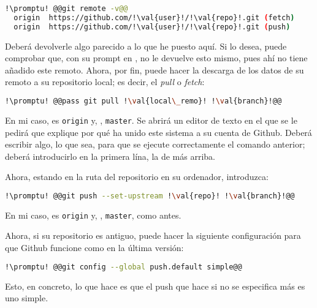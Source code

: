 \begin{lstlisting}[gobble=2,language=bash,style=bashinteract,escapechar=!]
  !\promptu! @@git remote -v@@
  origin  https://github.com/!\val{user}!/!\val{repo}!.git (fetch)
  origin  https://github.com/!\val{user}!/!\val{repo}!.git (push)
\end{lstlisting}

\noindent Deberá devolverle algo parecido a lo que he puesto aquí. Si lo desea, puede comprobar que, con su
prompt en , no le devuelve esto mismo, pues ahí no tiene añadido este remoto. Ahora, por fin,
puede hacer la descarga de los datos de su remoto a su repositorio local; es decir, el
\foreignlanguage{english}{\textit{pull}} o \foreignlanguage{english}{\textit{fetch}}:

\begin{lstlisting}[gobble=2,language=bash,style=bashinteract,escapechar=!]
  !\promptu! @@pass git pull !\val{local\_remo}! !\val{branch}!@@
\end{lstlisting}

\noindent En mi caso,  es \lstinline!origin! y, , \lstinline!master!. Se abrirá un
editor de texto en el que se le pedirá que explique por qué ha unido este sistema a su cuenta de Github. Deberá
escribir algo, lo que sea, para que se ejecute correctamente el comando anterior; deberá introducirlo en la
primera lína, la de más arriba.

Ahora, estando en la ruta del repositorio en su ordenador, introduzca:

\begin{lstlisting}[gobble=2,language=bash,style=bashinteract,escapechar=!]
  !\promptu! @@git push --set-upstream !\val{repo}! !\val{branch}!@@
\end{lstlisting}

\noindent En mi caso,  es \lstinline!origin! y, , \lstinline!master!, como antes.

Ahora, si su repositorio es antiguo, puede hacer la siguiente configuración para que Github funcione como en la
última versión:

\begin{lstlisting}[gobble=2,language=bash,style=bashinteract,escapechar=!]
  !\promptu! @@git config --global push.default simple@@
\end{lstlisting}

\noindent Esto, en concreto, lo que hace es que el push que hace si no se especifica más es uno simple.

